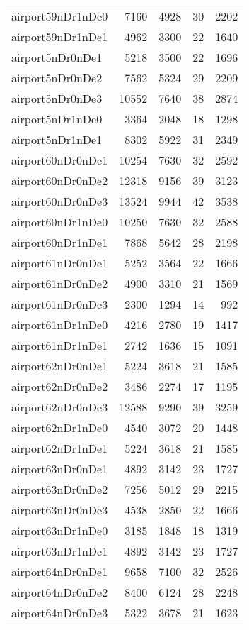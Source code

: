 \begin{tabular}{lrrrr}
airport59nDr1nDe0 & 7160 & 4928 & 30 & 2202 \\
airport59nDr1nDe1 & 4962 & 3300 & 22 & 1640 \\
airport5nDr0nDe1 & 5218 & 3500 & 22 & 1696 \\
airport5nDr0nDe2 & 7562 & 5324 & 29 & 2209 \\
airport5nDr0nDe3 & 10552 & 7640 & 38 & 2874 \\
airport5nDr1nDe0 & 3364 & 2048 & 18 & 1298 \\
airport5nDr1nDe1 & 8302 & 5922 & 31 & 2349 \\
airport60nDr0nDe1 & 10254 & 7630 & 32 & 2592 \\
airport60nDr0nDe2 & 12318 & 9156 & 39 & 3123 \\
airport60nDr0nDe3 & 13524 & 9944 & 42 & 3538 \\
airport60nDr1nDe0 & 10250 & 7630 & 32 & 2588 \\
airport60nDr1nDe1 & 7868 & 5642 & 28 & 2198 \\
airport61nDr0nDe1 & 5252 & 3564 & 22 & 1666 \\
airport61nDr0nDe2 & 4900 & 3310 & 21 & 1569 \\
airport61nDr0nDe3 & 2300 & 1294 & 14 & 992 \\
airport61nDr1nDe0 & 4216 & 2780 & 19 & 1417 \\
airport61nDr1nDe1 & 2742 & 1636 & 15 & 1091 \\
airport62nDr0nDe1 & 5224 & 3618 & 21 & 1585 \\
airport62nDr0nDe2 & 3486 & 2274 & 17 & 1195 \\
airport62nDr0nDe3 & 12588 & 9290 & 39 & 3259 \\
airport62nDr1nDe0 & 4540 & 3072 & 20 & 1448 \\
airport62nDr1nDe1 & 5224 & 3618 & 21 & 1585 \\
airport63nDr0nDe1 & 4892 & 3142 & 23 & 1727 \\
airport63nDr0nDe2 & 7256 & 5012 & 29 & 2215 \\
airport63nDr0nDe3 & 4538 & 2850 & 22 & 1666 \\
airport63nDr1nDe0 & 3185 & 1848 & 18 & 1319 \\
airport63nDr1nDe1 & 4892 & 3142 & 23 & 1727 \\
airport64nDr0nDe1 & 9658 & 7100 & 32 & 2526 \\
airport64nDr0nDe2 & 8400 & 6124 & 28 & 2248 \\
airport64nDr0nDe3 & 5322 & 3678 & 21 & 1623 \\

\end{tabular}
